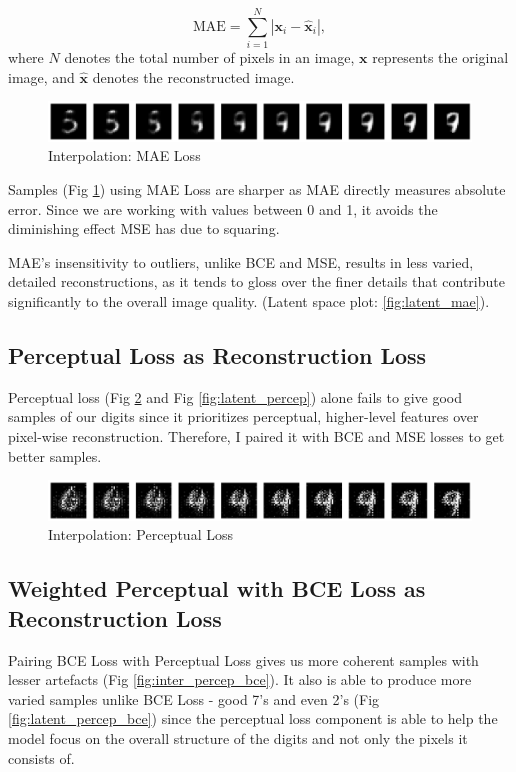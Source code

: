 \documentclass[12pt]{article}
\begin{document}
\begin{equation}
\text{MAE} = \sum_{i=1}^{N} |\mathbf{x}_i - \hat{\mathbf{x}}_i|,
\end{equation}
\noindent
where \(N\) denotes the total number of pixels in an image, $\mathbf{x}$ represents the original image, and $\hat{\mathbf{x}}$ denotes the reconstructed image.

\begin{figure}[h]
\centering
\includegraphics[width=1\linewidth]{report_images/mae/interpolation.png}
\caption{\label{fig:inter_mae}Interpolation: MAE Loss}
\end{figure}
\noindent
Samples (Fig \ref{fig:inter_mae}) using MAE Loss are sharper as MAE directly measures absolute error. Since we are working with values between 0 and 1, it avoids the diminishing effect MSE has due to squaring. 

MAE’s insensitivity to outliers, unlike BCE and MSE, results in less varied, detailed reconstructions, as it tends to gloss over the finer details that contribute significantly to the overall image quality. (Latent space plot: \ref{fig:latent_mae}).

\subsection{Perceptual Loss as Reconstruction Loss}

Perceptual loss (Fig \ref{fig:inter_percep} and Fig \ref{fig:latent_percep}) alone fails to give good samples of our digits since it prioritizes perceptual, higher-level features over pixel-wise reconstruction. Therefore, I paired it with BCE and MSE losses to get better samples.

\begin{figure}[h]
\centering
\includegraphics[width=1\linewidth]{report_images/percep/interpolation.png}
\caption{\label{fig:inter_percep}Interpolation: Perceptual Loss}
\end{figure}
\FloatBarrier



\subsection{Weighted Perceptual with BCE Loss as Reconstruction Loss}
Pairing BCE Loss with Perceptual Loss gives us more coherent samples with lesser artefacts (Fig \ref{fig:inter_percep_bce}). It also is able to produce more varied samples unlike BCE Loss - good 7's and even 2's (Fig \ref{fig:latent_percep_bce}) since the perceptual loss component is able to help the model focus on the overall structure of the digits and not only the pixels it consists of.
\end{document}
